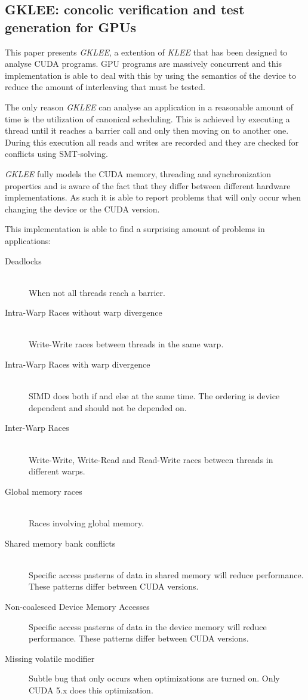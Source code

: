 \documentclass[10pt]{llncs}
\begin{document}
\subsection{GKLEE: concolic verification and test generation for GPUs \cite{base7}}

This paper presents \emph{GKLEE}, a extention of \emph{KLEE} \cite{klee} that has been designed to analyse CUDA programs. GPU programs are massively concurrent and this implementation is able to deal with this by using the semantics of the device to reduce the amount of interleaving that must be tested.

The only reason \emph{GKLEE} can analyse an application in a reasonable amount of time is the utilization of canonical scheduling. This is achieved by executing a thread until it reaches a barrier call and only then moving on to another one. During this execution all reads and writes are recorded and they are checked for conflicts using SMT-solving.

\emph{GKLEE} fully models the CUDA memory, threading and synchronization properties and is aware of the fact that they differ between different hardware implementations. As such it is able to report problems that will only occur when changing the device or the CUDA version.

This implementation is able to find a surprising amount of problems in applications:

\begin{description}
	\item[Deadlocks] \hfill \\
		When not all threads reach a barrier.
	\item[Intra-Warp Races without warp divergence]  \hfill \\
		Write-Write races between threads in the same warp.
	\item[Intra-Warp Races with warp divergence] \hfill \\
		SIMD does both if and else at the same time. The ordering is device dependent and should not be depended on.
	\item[Inter-Warp Races] \hfill \\
		Write-Write, Write-Read and Read-Write races between threads in different warps.
	\item[Global memory races] \hfill \\
		Races involving global memory.
	\item[Shared memory bank conflicts] \hfill \\
		Specific access pasterns of data in shared memory will reduce performance. These patterns differ between CUDA versions.
	\item[Non-coalesced Device Memory Accesses]
		Specific access pasterns of data in the device memory will reduce performance. These patterns differ between CUDA versions.
	\item[Missing volatile modifier]
		Subtle bug that only occurs when optimizations are turned on. Only CUDA 5.x does this optimization.
\end{description}
\end{document}
